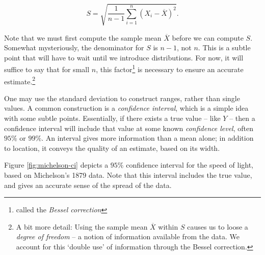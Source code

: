 \documentclass[../primer.tex]{subfiles}
\begin{document}
\begin{equation} \label{eq:def-sample-sd}
  S = \sqrt{\frac{1}{n-1}\sum_{i=1}^n (X_i - \overline{X})^2}.
\end{equation}

Note that we must first compute the sample mean $\overline{X}$ before we can
compute $S$. Somewhat mysteriously, the denominator for $S$ is $n-1$, not $n$.
This is a subtle point that will have to wait until we introduce distributions.
For now, it will suffice to say that for small $n$, this factor\footnote{called
  the \emph{Bessel correction}} is necessary to ensure an accurate
estimate.\footnote{A bit more detail: Using the sample mean $\overline{X}$
  within $S$ causes us to loose a \emph{degree of freedom} -- a notion of
  information available from the data. We account for this `double use' of
  information through the Bessel correction.}

One may use the standard deviation to construct ranges, rather than single
values. A common construction is a \emph{confidence
  interval}, which is a simple idea with some subtle points. Essentially, if
there exists a true value -- like $Y$ -- then a confidence interval will include
that value at some known \emph{confidence level}, often $95\%$ or $99\%$. An
interval gives more information than a mean alone; in addition to location, it
conveys the quality of an estimate, based on its width.

Figure \ref{fig:michelson-ci} depicts a $95\%$ confidence interval for the speed
of light, based on Michelson's 1879 data. Note that this interval includes the
true value, and gives an accurate sense of the spread of the data.
\end{document}

